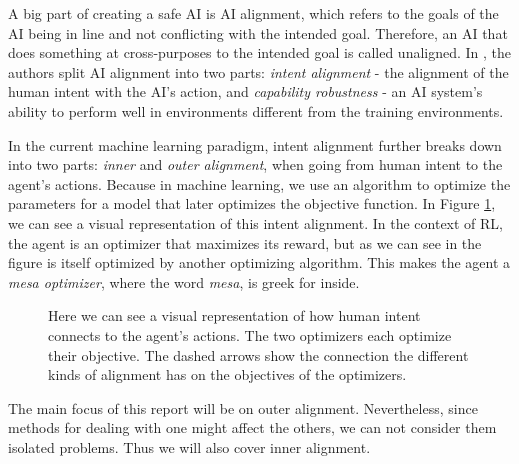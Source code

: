 \documentclass[12pt,A4]{report}
\theoremstyle{definition}
\begin{document}


A big part of creating a safe AI is AI alignment, which refers to the goals of the AI being in line and not conflicting with the intended goal. Therefore, an AI that does something at cross-purposes to the intended goal is called unaligned. In \citet{Hubringer}, the authors split AI alignment into two parts: \textit{intent alignment} - the alignment of the human intent with the AI's action, and \textit{capability robustness} - an AI system's ability to perform well in environments different from the training environments. 

In the current machine learning paradigm, intent alignment further breaks down into two parts: \textit{inner} and \textit{outer alignment}, when going from human intent to the agent's actions. Because in machine learning, we use an algorithm to optimize the parameters for a model that later optimizes the objective function. In Figure \ref{fig:alignment}, we can see a visual representation of this intent alignment. In the context of RL, the agent is an optimizer that maximizes its reward, but as we can see in the figure is itself optimized by another optimizing algorithm. This makes the agent a \textit{mesa optimizer}, where the word \textit{mesa}, is greek for inside. 

\begin{figure}[H]
  
  \caption{Here we can see a visual representation of how human intent connects to the agent's actions. The two optimizers each optimize their objective. The dashed arrows show the connection the different kinds of alignment has on the objectives of the optimizers.}
  \label{fig:alignment}
\end{figure}

The main focus of this report will be on outer alignment. Nevertheless, since methods for dealing with one might affect the others, we can not consider them isolated problems. Thus we will also cover inner alignment.
\end{document}
